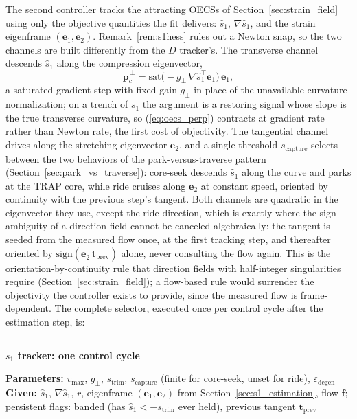 \documentclass[lettersize,journal]{IEEEtran}
\begin{document}
The second controller tracks the attracting OECSs of
Section~\ref{sec:strain_field} using only the objective quantities the
fit delivers: $\hat{s}_1$, $\nabla\hat{s}_1$, and the strain eigenframe
$(\mathbf{e}_1, \mathbf{e}_2)$. Remark~\ref{rem:s1hess} rules out a
Newton snap, so the two channels are built differently from the $D$ tracker's.
The transverse channel descends $\hat{s}_1$ along the compression
eigenvector,
\begin{equation}
    \dot{\mathbf{p}}_c^{\,\perp} =
    \mathrm{sat}\!\bigl(-g_\perp\,\nabla\hat{s}_1^\top
    \mathbf{e}_1\bigr)\,\mathbf{e}_1,
    \label{eq:oecs_perp}
\end{equation}
a saturated gradient step with fixed gain $g_\perp$ in place of the
unavailable curvature normalization; on a trench of $s_1$ the argument
is a restoring signal whose slope is the true transverse curvature, so
(\ref{eq:oecs_perp}) contracts at gradient rate rather than Newton
rate, the first cost of objectivity. The tangential channel drives
along the stretching eigenvector $\mathbf{e}_2$, and a single threshold
$s_{\text{capture}}$ selects between the two behaviors of the
park-versus-traverse pattern (Section~\ref{sec:park_vs_traverse}):
core-seek descends $\hat{s}_1$ along the curve and parks at the TRAP
core, while ride cruises along $\mathbf{e}_2$ at constant speed,
oriented by continuity with the previous step's tangent.
Both channels are quadratic in the eigenvector they use, except the
ride direction, which is exactly where the sign ambiguity of a
direction field cannot be canceled algebraically: the tangent is
seeded from the measured flow once, at the first tracking step, and
thereafter oriented by $\mathrm{sign}(\mathbf{e}_2^\top
\mathbf{t}_{\text{prev}})$ alone, never consulting the flow again. This
is the orientation-by-continuity rule that direction fields with
half-integer singularities require
(Section~\ref{sec:strain_field}); a flow-based rule would surrender
the objectivity the controller exists to provide, since the measured
flow is frame-dependent. The complete selector, executed once per
control cycle after the estimation step, is:

\vspace{4pt}
\hrule
\vspace{4pt}
\noindent\textbf{$s_1$ tracker: one control cycle}

\vspace{3pt}
\noindent\textbf{Parameters:} $v_{\max}$, $g_\perp$,
$s_{\text{trim}}$, $s_{\text{capture}}$ (finite for core-seek, unset
for ride), $\varepsilon_{\text{degen}}$\\
\textbf{Given:} $\hat{s}_1$, $\nabla\hat{s}_1$, $r$, eigenframe
$(\mathbf{e}_1, \mathbf{e}_2)$ from Section~\ref{sec:s1_estimation},
flow $\mathbf{f}$; persistent flags: banded (has $\hat{s}_1 <
-s_{\text{trim}}$ ever held), previous tangent
$\mathbf{t}_{\text{prev}}$
\end{document}
